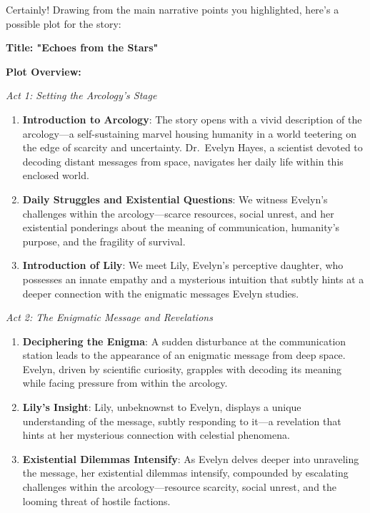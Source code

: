 \begin{aquote}
    Certainly! Drawing from the main narrative points you highlighted, here's a possible plot for the story:\medskip

    \noindent\textbf{Title: "Echoes from the Stars"}\medskip

    \noindent\textbf{Plot Overview:}\medskip

    \noindent\emph{Act 1: Setting the Arcology's Stage}
    \begin{enumerate}
        \item \textbf{Introduction to Arcology}: The story opens with a vivid description of the arcology—a self-sustaining marvel housing humanity in a world teetering on the edge of scarcity and uncertainty. Dr.~Evelyn Hayes, a scientist devoted to decoding distant messages from space, navigates her daily life within this enclosed world.
        \item \textbf{Daily Struggles and Existential Questions}: We witness Evelyn's challenges within the arcology—scarce resources, social unrest, and her existential ponderings about the meaning of communication, humanity's purpose, and the fragility of survival.
        \item \textbf{Introduction of Lily}: We meet Lily, Evelyn's perceptive daughter, who possesses an innate empathy and a mysterious intuition that subtly hints at a deeper connection with the enigmatic messages Evelyn studies.
    \end{enumerate}

    \noindent\emph{Act 2: The Enigmatic Message and Revelations}
    \begin{enumerate}
        \item \textbf{Deciphering the Enigma}: A sudden disturbance at the communication station leads to the appearance of an enigmatic message from deep space. Evelyn, driven by scientific curiosity, grapples with decoding its meaning while facing pressure from within the arcology.
        \item \textbf{Lily's Insight}: Lily, unbeknownst to Evelyn, displays a unique understanding of the message, subtly responding to it—a revelation that hints at her mysterious connection with celestial phenomena.
        \item \textbf{Existential Dilemmas Intensify}: As Evelyn delves deeper into unraveling the message, her existential dilemmas intensify, compounded by escalating challenges within the arcology—resource scarcity, social unrest, and the looming threat of hostile factions.
    \end{enumerate}


\end{aquote}
